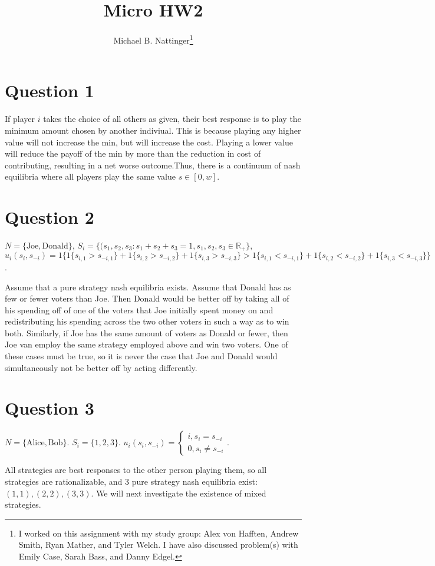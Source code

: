 \documentclass[11pt]{article} %
\title{Micro HW2}
\author{Michael B. Nattinger\footnote{I worked on this assignment with my study group: Alex von Hafften, Andrew Smith, Ryan Mather, and Tyler Welch. I have also discussed problem(s) with Emily Case, Sarah Bass, and Danny Edgel.}}
\begin{document}
\maketitle

\section{Question 1}
If player $i$ takes the choice of all others as given, their best response is to play the minimum amount chosen by another indiviual. This is because playing any higher value will not increase the min, but will increase the cost. Playing a lower value will reduce the payoff of the min by more than the reduction in cost of contributing, resulting in a net worse outcome.Thus, there is a continuum of nash equilibria where all players play the same value $s \in [0,w]$.
\section{Question 2}
$N = \{\text{Joe}, \text{Donald} \}$, $S_i = \{(s_1,s_2,s_3: s_1+s_2+s_3 = 1, s_1,s_2,s_3 \in \mathbb{R}_{+} \}$, $u_i(s_i,s_{-i}) = 1\{ 1\{s_{i,1}>s_{-i,1} \}+1\{ s_{i,2}>s_{-i,2} \} + 1\{s_{i,3}>s_{-i,3} \} > 1\{s_{i,1}<s_{-i,1} \}+1\{ s_{i,2}<s_{-i,2} \} + 1\{s_{i,3}<s_{-i,3} \} \}$.

Assume that a pure strategy nash equilibria exists. Assume that Donald has as few or fewer voters than Joe. Then Donald would be better off by taking all of his spending off of one of the voters that Joe initially spent money on and redistributing his spending across the two other voters in such a way as to win both. Similarly, if Joe has the same amount of voters as Donald or fewer, then Joe van employ the same strategy employed above and win two voters. One of these cases must be true, so it is never the case that Joe and Donald would simultaneously not be better off by acting differently.

\section{Question 3}
$N = \{ \text{Alice}, \text{Bob}\}.$ $S_i = \{1,2,3\}$. $u_i(s_i,s_{-i}) = \begin{cases} i, s_i = s_{-i}\\0, s_i \neq s_{-i} \end{cases}$. 

All strategies are best responses to the other person playing them, so all strategies are rationalizable, and 3 pure strategy nash equilibria exist: $(1,1),(2,2),(3,3)$. We will next investigate the existence of mixed strategies.
\end{document}
